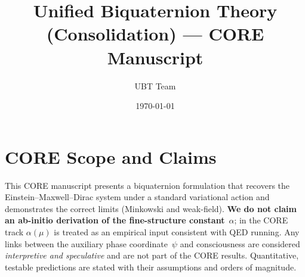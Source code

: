 \documentclass[11pt,a4paper]{article}
\title{Unified Biquaternion Theory (Consolidation) --- CORE Manuscript}
\author{UBT Team}
\date{\today}
\begin{document}
\maketitle

\appendix
\tableofcontents

\section*{CORE Scope and Claims}
This CORE manuscript presents a biquaternion formulation that recovers the Einstein--Maxwell--Dirac system under a standard variational action and demonstrates the correct limits (Minkowski and weak-field). \textbf{We do not claim an ab-initio derivation of the fine-structure constant}~$\alpha$; in the CORE track $\alpha(\mu)$ is treated as an empirical input consistent with QED running. Any links between the auxiliary phase coordinate~$\psi$ and consciousness are considered \emph{interpretive and speculative} and are not part of the CORE results. Quantitative, testable predictions are stated with their assumptions and orders of magnitude.











\end{document}
